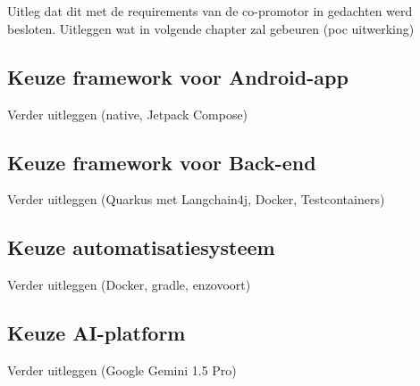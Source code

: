 
\chapter{}
\label{ch:shortlist}
Uitleg dat dit met de requirements van de co-promotor in gedachten werd besloten.
Uitleggen wat in volgende chapter zal gebeuren (poc uitwerking)

\section{Keuze framework voor Android-app}
\label{sec:keuze-framework-voor-android-app}
Verder uitleggen (native, Jetpack Compose)

\section{Keuze framework voor Back-end}
\label{sec:keuze-framework-voor-back-end}
Verder uitleggen (Quarkus met Langchain4j, Docker, Testcontainers)

\section{Keuze automatisatiesysteem}
\label{sec:keuze-automatisatiesysteem}
Verder uitleggen (Docker, gradle, enzovoort)

\section{Keuze AI-platform}
\label{sec:keuze-ai-platform}
Verder uitleggen (Google Gemini 1.5 Pro)